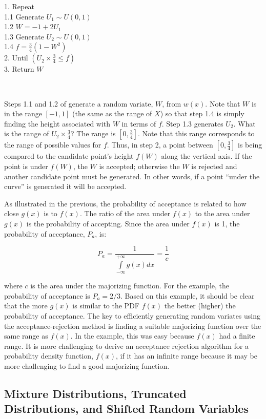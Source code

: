 \documentclass[
]{book}
\theoremstyle{definition}
\theoremstyle{definition}
\theoremstyle{definition}
\theoremstyle{definition}
\theoremstyle{remark}
\begin{document}
1. Repeat\\
1.1 Generate \(U_{1} \sim U(0,1)\)\\
1.2 \(W = -1 + 2U_{1}\)\\
1.3 Generate \(U_{2} \sim U(0,1)\)\\
1.4 \(f = \frac{3}{4}(1-W^2)\)\\
2. Until \((U_{2} \times \frac{3}{4} \leq f)\)\\
3. Return \(W\)

~

Steps 1.1 and 1.2 of generate a random variate, \(W\), from \(w(x)\).
Note that \(W\) is in the range \(\left[-1,1\right]\) (the same as the range
of \(X\)) so that step 1.4 is simply finding the height associated with \(W\)
in terms of \(f\). Step 1.3 generates \(U_{2}\). What is the range of
\(U_{2} \times \frac{3}{4}\)? The range is \(\left[0,\frac{3}{4}\right]\).
Note that this range corresponds to the range of possible values for
\(f\). Thus, in step 2, a point between \(\left[0,\frac{3}{4}\right]\) is
being compared to the candidate point's height \(f(W)\) along the vertical
axis. If the point is under \(f(W)\), the \(W\) is accepted; otherwise the
\(W\) is rejected and another candidate point must be generated. In other
words, if a point ``under the curve'' is generated it will be accepted.

As illustrated in the previous, the probability of acceptance is related to
how close \(g(x)\) is to \(f(x)\). The ratio of the area under \(f(x)\) to the
area under \(g(x)\) is the probability of accepting. Since the area under
\(f(x)\) is 1, the probability of acceptance, \(P_{a}\), is:

\[
P_{a} = \frac{1}{\int\limits_{-\infty}^{+\infty} g(x) dx} = \frac{1}{c}
\]

where \(c\) is the area under the majorizing function. For the example, the probability of acceptance is \(P_{a} = 2/3\). Based on this example, it should be clear that the more
\(g(x)\) is similar to the PDF \(f(x)\) the better (higher) the probability
of acceptance. The key to efficiently generating random variates using
the acceptance-rejection method is finding a suitable majorizing
function over the same range as \(f(x)\). In the example, this was easy
because \(f(x)\) had a finite range. It is more challenging to derive an
acceptance rejection algorithm for a probability density function,
\(f(x)\), if it has an infinite range because it may be more challenging
to find a good majorizing function.

\hypertarget{AppRNRV:subsec:MTSRV}{%
\subsection{Mixture Distributions, Truncated Distributions, and Shifted Random Variables}\label{AppRNRV:subsec:MTSRV}}
\end{document}
